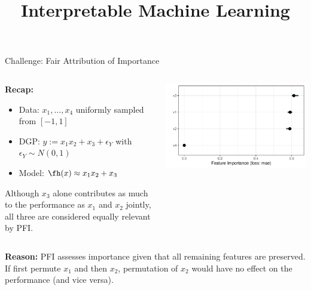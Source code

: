 \documentclass[11pt,compress,t,notes=noshow, aspectratio=169, xcolor=table]{beamer}
\title{Interpretable Machine Learning}
\date{}
\begin{document}
	\newcommand{\titlefigure}{figure_man/feature-importance.png}
    \newcommand{\learninggoals}{
    	\item Underdstand how PFI is computed
    	\item Understanding strengths and weaknesses
    	\item Testing Importance}
	
	
	

	

\begin{frame}{Challenge: Fair Attribution of Importance}
\begin{columns}[T]
\begin{column}{0.54\textwidth}
\textbf{Recap:} 
\begin{itemize}
\item Data: $x_1, \dots, x_4$ uniformly sampled from $[-1, 1]$ 
\item DGP: $y:= x_1 x_2 + x_3 + \epsilon_Y$ with $\epsilon_Y \sim N(0, 1)$
\item Model: $\fh(x) \approx x_1 x_2 + x_3$
\end{itemize}

Although $x_3$ alone contributes as much to the performance as $x_1$ and $x_2$ jointly, all three are considered equally relevant by PFI.
\end{column}
\begin{column}{0.45\textwidth}
\centering
  \includegraphics[width=\linewidth]{figure_man/pfi_interactions.pdf}
\end{column}
\end{columns}
\lz
\textbf{Reason:} PFI assesses importance given that all remaining features are preserved. If first permute $x_1$ and then $x_2$, permutation of $x_2$ would have no effect on the performance (and vice versa).
\end{frame}
\end{document}
